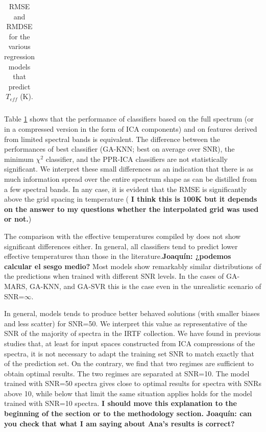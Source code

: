 \begin{table}
\begin{tabular}{@{}rrrcrrcrr@{}}
\bottomrule
\end{tabular}
\caption {RMSE and RMDSE for the various regression models that predict $T_{eff}$ (K).} 
\label{tab:model_TSD} 
\end{table}

Table \ref{tab:model_TSD} shows that the performance of classifiers
based on the full spectrum (or in a compressed version in the form of
ICA components) and on features derived from limited spectral bands is
equivalent. The difference between the performances of best classifier
(GA-KNN; best on average over SNR), the minimum $\chi^2$ classifier,
and the PPR-ICA classifiers are not statistically significant. We
interpret these small differences as an indication that there is as
much information spread over the entire spectrum shape as can be
distilled from a few spectral bands. In any case, it is evident that
the RMSE is significantly above the grid spacing in temperature ({\bf
I think this is 100K but it depends on the answer to my questions
whether the interpolated grid was used or not.})

The comparison with the effective temperatures compiled
by \cite{cesetti} does not show significant differences either. In
general, all classifiers tend to predict lower effective temperatures
than those in the literature.{\bf Joaquín: ¿podemos calcular el sesgo
medio?} Most models show remarkably similar distributions of the
predictions when trained with different SNR levels. In the cases of
GA-MARS, GA-KNN, and GA-SVR this is the case even in the unrealistic
scenario of SNR=$\infty$.

In general, models tends to produce better behaved solutions (with
smaller biases and less scatter) for SNR=50. We interpret this value
as representative of the SNR of the majority of spectra in the IRTF
collection. We have found in previous studies that, at least for input
spaces constructed from ICA compressions of the spectra, it is not
necessary to adapt the training set SNR to match exactly that of the
prediction set. On the contrary, we find that two regimes are
sufficient to obtain optimal results. The two regimes are separated at
SNR=10. The model trained with SNR=50 spectra gives close to optimal
results for spectra with SNRs above 10, while below that limit the
same situation applies holds for the model trained with SNR=10
spectra. {\bf I should move this explanation to the beginning of the
section or to the methodology section. Joaquín: can you check that
what I am saying about Ana's results is correct?}




